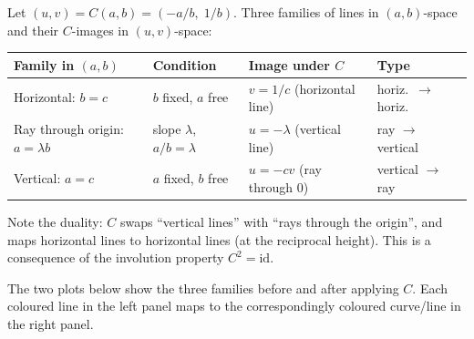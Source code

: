 \documentclass[11pt,a4paper]{article}
\begin{document}
Let $(u,v) = C(a,b) = (-a/b,\;1/b)$.  Three families of lines in $(a,b)$-space and their
$C$-images in $(u,v)$-space:

\begin{center}
\renewcommand{\arraystretch}{1.6}
\begin{tabular}{p{3.8cm}p{3.2cm}p{4cm}p{3cm}}
\toprule
\textbf{Family in $(a,b)$} & \textbf{Condition} & \textbf{Image under $C$} & \textbf{Type} \\
\midrule
Horizontal: $b = c$
  & $b$ fixed, $a$ free
  & $v = 1/c$ \newline(horizontal line)
  & horiz.\ $\to$ horiz. \\
Ray through origin: $a = \lambda b$
  & slope $\lambda$, $a/b=\lambda$
  & $u = -\lambda$ \newline(vertical line)
  & ray $\to$ vertical \\
Vertical: $a = c$
  & $a$ fixed, $b$ free
  & $u = -cv$ \newline(ray through $0$)
  & vertical $\to$ ray \\
\bottomrule
\end{tabular}
\end{center}

\noindent Note the duality: $C$ swaps ``vertical lines'' with ``rays through the origin'',
and maps horizontal lines to horizontal lines (at the reciprocal height).  This is a
consequence of the involution property $C^2=\mathrm{id}$.

\bigskip

The two plots below show the three families before and after applying $C$.  Each coloured
line in the left panel maps to the correspondingly coloured curve/line in the right panel.
\end{document}
